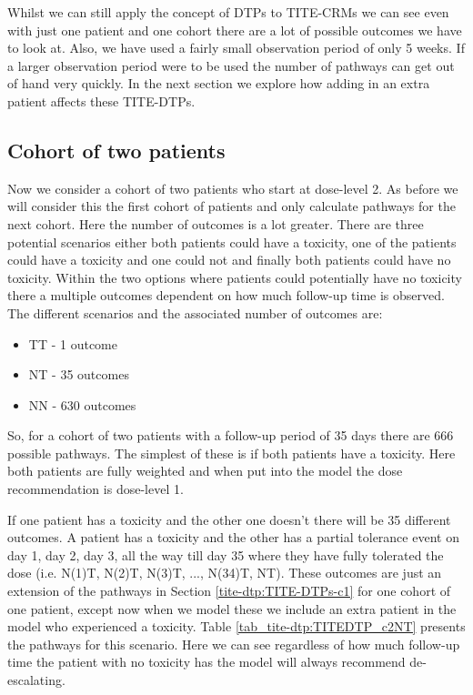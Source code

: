 Whilst we can still apply the concept of DTPs to TITE-CRMs we can see even with just one patient and one cohort there are a lot of possible outcomes we have to look at. Also, we have used a fairly small observation period of only 5 weeks. If a larger observation period were to be used the number of pathways can get out of hand very quickly. In the next section we explore how adding in an extra patient affects these TITE-DTPs.  


\subsection{Cohort of two patients}
\label{tite-dtp:TITE-DTPs-c2}
Now we consider a cohort of two patients who start at dose-level 2. As before we will consider this the first cohort of patients and only calculate pathways for the next cohort. Here the number of outcomes is a lot greater. There are three potential scenarios either both patients could have a toxicity, one of the patients could have a toxicity and one could not and finally both patients could have no toxicity. Within the two options where patients could potentially have no toxicity there a multiple outcomes dependent on how much follow-up time is observed. The different scenarios and the associated number of outcomes are: 

\begin{itemize}
	\item TT - 1 outcome 
	\item NT - 35 outcomes 
	\item NN - 630 outcomes
\end{itemize}

So, for a cohort of two patients with a follow-up period of 35 days there are 666 possible pathways. The simplest of these is if both patients have a toxicity. Here both patients are fully weighted and when put into the model the dose recommendation is dose-level 1. 

If one patient has a toxicity and the other one doesn't there will be 35 different outcomes. A patient has a toxicity and the other has a partial tolerance event on day 1, day 2, day 3, all the way till day 35 where they have fully tolerated the dose (i.e. N(1)T, N(2)T, N(3)T, ..., N(34)T, NT). These outcomes are just an extension of the pathways in Section \ref{tite-dtp:TITE-DTPs-c1} for one cohort of one patient, except now when we model these we include an extra patient in the model who experienced a toxicity. Table \ref{tab_tite-dtp:TITEDTP_c2NT} presents the pathways for this scenario. Here we can see regardless of how much follow-up time the patient with no toxicity has the model will always recommend de-escalating. 

